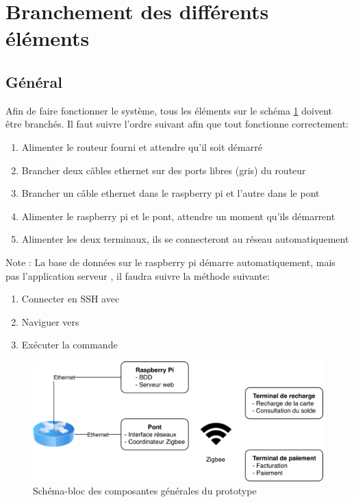 \section{Branchement des différents éléments}
	\subsection{Général}
	Afin de faire fonctionner le système, tous les éléments sur le schéma \ref{fig.general} doivent être branchés. Il faut suivre l’ordre suivant afin que tout fonctionne correctement:
	\begin{enumerate}
		\item Alimenter le routeur fourni et attendre qu’il soit démarré
		\item Brancher deux câbles ethernet sur des ports libres (gris) du routeur
		\item Brancher un câble ethernet dans le raspberry pi et l’autre dans le pont
		\item Alimenter le raspberry pi et le pont, attendre un moment qu’ils démarrent
		\item Alimenter les deux terminaux, ils se connecteront au réseau automatiquement
	\end{enumerate}

Note : La base de données sur le raspberry pi démarre automatiquement, mais pas l’application \og serveur \fg{}, il faudra suivre la méthode suivante:
	\begin{enumerate}
		\item Connecter en SSH avec 
		\item Naviguer vers 	
		\item Exécuter la commande 
	\end{enumerate}
	
	\begin{figure}[p]
		\includegraphics[width=\textwidth]{Pictures/Branchements/general}
		\caption{Schéma-bloc des composantes générales du prototype}
		\label{fig.general}
	\end{figure}

